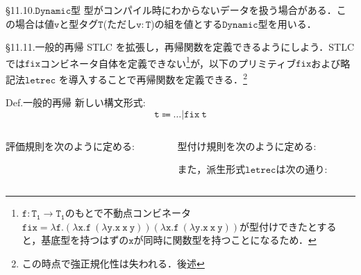 \documentclass[9pt]{beamer}
\begin{document}
\begin{frame}{\S11.10.$\mathtt{Dynamic}$型}
型がコンパイル時にわからないデータを扱う場合がある．この場合は値$\mathtt{v}$と型タグ$\mathtt{T}$(ただし$\mathtt{v:T}$)の組を値とする$\mathtt{Dynamic}$型を用いる．
\end{frame}
\begin{frame}{\S11.11.一般的再帰}
STLC を拡張し，再帰関数を定義できるようにしよう．STLC では$\mathtt{fix}$コンビネータ自体を定義できない\footnote{$\mathtt{f:T_{1}\to T_{1}}$のもとで不動点コンビネータ$\mathtt{fix=\lambda f.(\lambda x. f\ (\lambda y. x\ x\ y))(\lambda x.f\ (\lambda y. x\ x\ y))}$が型付けできたとすると，基底型を持つはずの$\mathtt{x}$が同時に関数型を持つことになるため．}が，以下のプリミティブ$\mathtt{fix}$および略記法$\mathtt{letrec}$
を導入することで再帰関数を定義できる．\footnote{この時点で強正規化性は失われる．後述}
\begin{alertblock}{Def.一般的再帰}
新しい構文形式:
\begin{equation*}
\mathtt{t\Coloneq\ldots|fix\ t}
\end{equation*}\begin{columns}
\begin{column}{0.5\columnwidth}
評価規則を次のように定める:
\end{column}
\begin{column}{0.5\columnwidth}
型付け規則を次のように定める:

また，派生形式$\mathtt{letrec}$は次の通り:
\end{column}
\end{columns}
\end{alertblock}
\end{frame}
\end{document}
